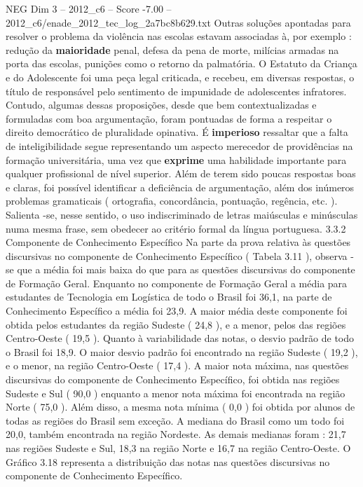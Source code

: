 \begin{textsample}{NEG Dim 3 – 2012\_c6 – Score -7.00 – 2012\_c6/enade\_2012\_tec\_log\_2a7bc8b629.txt}
Outras soluções apontadas para resolver o problema da violência nas escolas estavam associadas à, por exemplo : redução da \textbf{maioridade} penal, defesa da pena de morte, milícias armadas na porta das escolas, punições como o retorno da palmatória.
O Estatuto da Criança e do Adolescente foi uma peça legal criticada, e recebeu, em diversas respostas, o título de responsável pelo sentimento de impunidade de adolescentes infratores.
Contudo, algumas dessas proposições, desde que bem contextualizadas e formuladas com boa argumentação, foram pontuadas de forma a respeitar o direito democrático de pluralidade opinativa.
É \textbf{imperioso} ressaltar que a falta de inteligibilidade segue representando um aspecto merecedor de providências na formação universitária, uma vez que \textbf{exprime} uma habilidade importante para qualquer profissional de nível superior.
Além de terem sido poucas respostas boas e claras, foi possível identificar a deficiência de argumentação, além dos inúmeros problemas gramaticais ( ortografia, concordância, pontuação, regência, etc. ).
Salienta -se, nesse sentido, o uso indiscriminado de letras maiúsculas e minúsculas numa mesma frase, sem obedecer ao critério formal da língua portuguesa. 3.3.2 Componente de Conhecimento Específico Na parte da prova relativa às questões discursivas no componente de Conhecimento Específico ( Tabela 3.11 ), observa -se que a média foi mais baixa do que para as questões discursivas do componente de Formação Geral.
Enquanto no componente de Formação Geral a média para estudantes de Tecnologia em Logística de todo o Brasil foi 36,1, na parte de Conhecimento Específico a média foi 23,9.
A maior média deste componente foi obtida pelos estudantes da região Sudeste ( 24,8 ), e a menor, pelos das regiões Centro-Oeste ( 19,5 ).
Quanto à variabilidade das notas, o desvio padrão de todo o Brasil foi 18,9.
O maior desvio padrão foi encontrado na região Sudeste ( 19,2 ), e o menor, na região Centro-Oeste ( 17,4 ).
A maior nota máxima, nas questões discursivas do componente de Conhecimento Específico, foi obtida nas regiões Sudeste e Sul ( 90,0 ) enquanto a menor nota máxima foi encontrada na região Norte ( 75,0 ).
Além disso, a mesma nota mínima ( 0,0 ) foi obtida por alunos de todas as regiões do Brasil sem exceção.
A mediana do Brasil como um todo foi 20,0, também encontrada na região Nordeste.
As demais medianas foram : 21,7 nas regiões Sudeste e Sul, 18,3 na região Norte e 16,7 na região Centro-Oeste.
O Gráfico 3.18 representa a distribuição das notas nas questões discursivas no componente de Conhecimento Específico.

\end{textsample}

